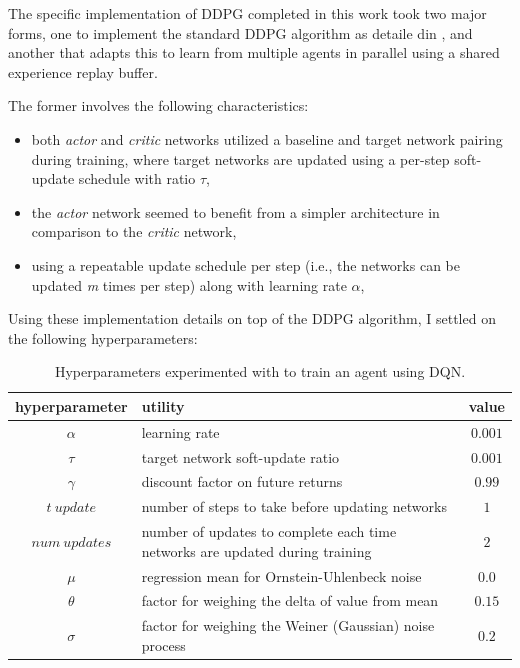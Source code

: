 \documentclass[11pt]{article}
\begin{document}
The specific implementation of DDPG completed in this work took two major forms, one to implement the standard DDPG algorithm as detaile din \cite{ddpg}, and another that adapts this to learn from multiple agents in parallel using a shared experience replay buffer.

The former involves the following characteristics:
\begin{itemize}
	\item both \textit{actor} and \textit{critic} networks utilized a baseline and target network pairing during training, where target networks are updated using a per-step soft-update schedule with ratio $\tau$,
	\item the \textit{actor} network seemed to benefit from a simpler architecture in comparison to the \textit{critic} network,
	\item using a repeatable update schedule per step (i.e., the networks can be updated \textit{m} times per step) along with learning rate $\alpha$,
\end{itemize}

 \FloatBarrier
 
 Using these implementation details on top of the DDPG algorithm, I settled on the following hyperparameters:
 
 \FloatBarrier
 
 \begin{table}[!ht]
 	\centering
 	\begin{tabular}{ c | p{6cm} | c }
 		\textbf{hyperparameter} & \textbf{utility} & \textbf{value} \\
 		\hline
 		$\alpha$ & learning rate & $0.001$ \\
 		$\tau$ & target network soft-update ratio & $0.001$ \\
 		$\gamma$ & discount factor on future returns & $0.99$ \\
 		$t\ update$ & number of steps to take before updating networks & $1$ \\
 		$num\ updates$ & number of updates to complete each time networks are updated during training & $2$ \\
 		$\mu$ & regression mean for Ornstein-Uhlenbeck noise & $0.0$ \\
 		$\theta$ & factor for weighing the delta of value from mean & $0.15$ \\
 		$\sigma$ & factor for weighing the Weiner (Gaussian) noise process & $0.2$ \\
 		\hline
 	\end{tabular}
 	\caption{Hyperparameters experimented with to train an agent using DQN.}
 	\label{tbl:parameters}
 \end{table}
 
\end{document}
